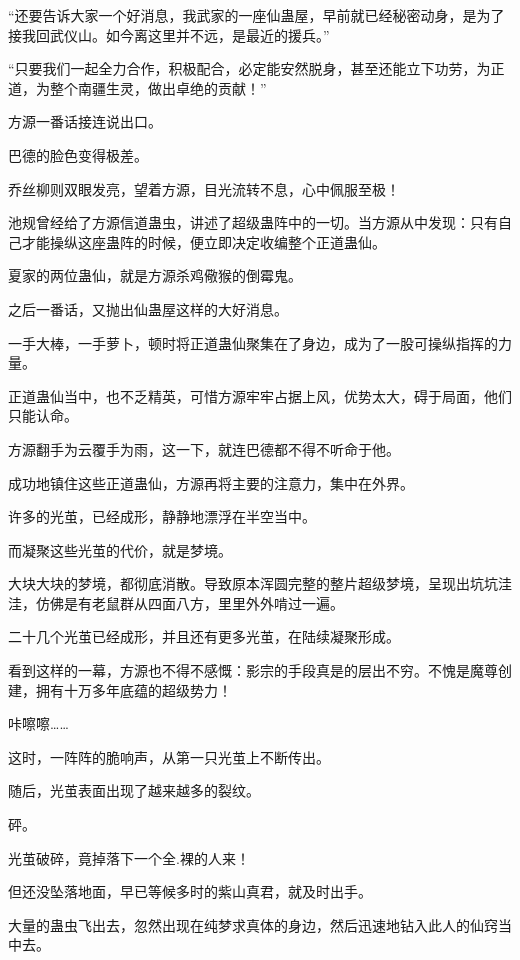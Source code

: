 
\begin{this_body}

“还要告诉大家一个好消息，我武家的一座仙蛊屋，早前就已经秘密动身，是为了接我回武仪山。如今离这里并不远，是最近的援兵。”

“只要我们一起全力合作，积极配合，必定能安然脱身，甚至还能立下功劳，为正道，为整个南疆生灵，做出卓绝的贡献！”

方源一番话接连说出口。

巴德的脸色变得极差。

乔丝柳则双眼发亮，望着方源，目光流转不息，心中佩服至极！

池规曾经给了方源信道蛊虫，讲述了超级蛊阵中的一切。当方源从中发现：只有自己才能操纵这座蛊阵的时候，便立即决定收编整个正道蛊仙。

夏家的两位蛊仙，就是方源杀鸡儆猴的倒霉鬼。

之后一番话，又抛出仙蛊屋这样的大好消息。

一手大棒，一手萝卜，顿时将正道蛊仙聚集在了身边，成为了一股可操纵指挥的力量。

正道蛊仙当中，也不乏精英，可惜方源牢牢占据上风，优势太大，碍于局面，他们只能认命。

方源翻手为云覆手为雨，这一下，就连巴德都不得不听命于他。

成功地镇住这些正道蛊仙，方源再将主要的注意力，集中在外界。

许多的光茧，已经成形，静静地漂浮在半空当中。

而凝聚这些光茧的代价，就是梦境。

大块大块的梦境，都彻底消散。导致原本浑圆完整的整片超级梦境，呈现出坑坑洼洼，仿佛是有老鼠群从四面八方，里里外外啃过一遍。

二十几个光茧已经成形，并且还有更多光茧，在陆续凝聚形成。

看到这样的一幕，方源也不得不感慨：影宗的手段真是的层出不穷。不愧是魔尊创建，拥有十万多年底蕴的超级势力！

咔嚓嚓……

这时，一阵阵的脆响声，从第一只光茧上不断传出。

随后，光茧表面出现了越来越多的裂纹。

砰。

光茧破碎，竟掉落下一个全.裸的人来！

但还没坠落地面，早已等候多时的紫山真君，就及时出手。

大量的蛊虫飞出去，忽然出现在纯梦求真体的身边，然后迅速地钻入此人的仙窍当中去。


\end{this_body}
